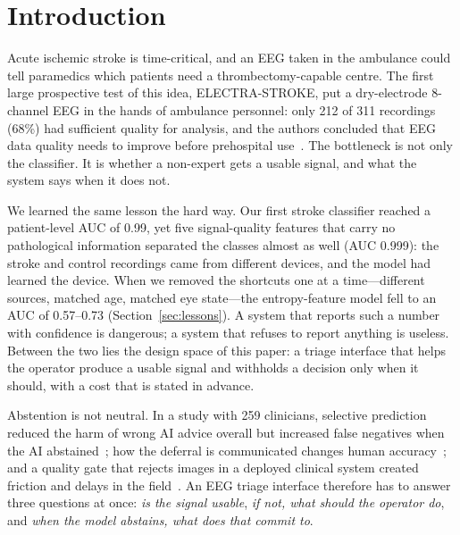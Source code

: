 \documentclass[sigconf,review,anonymous]{acmart}
\begin{document}
\maketitle

\section{Introduction}

Acute ischemic stroke is time-critical, and an EEG taken in the ambulance could tell paramedics which patients need a thrombectomy-capable centre.
The first large prospective test of this idea, ELECTRA-STROKE, put a dry-electrode 8-channel EEG in the hands of ambulance personnel: only 212 of 311 recordings (68\%) had sufficient quality for analysis, and the authors concluded that EEG data quality needs to improve before prehospital use~\cite{vanstigt2023electra}.
The bottleneck is not only the classifier. It is whether a non-expert gets a usable signal, and what the system says when it does not.

We learned the same lesson the hard way. Our first stroke classifier reached a patient-level AUC of 0.99, yet five signal-quality features that carry no pathological information separated the classes almost as well (AUC 0.999): the stroke and control recordings came from different devices, and the model had learned the device.
When we removed the shortcuts one at a time---different sources, matched age, matched eye state---the entropy-feature model fell to an AUC of 0.57--0.73 (Section~\ref{sec:lessons}).
A system that reports such a number with confidence is dangerous; a system that refuses to report anything is useless.
Between the two lies the design space of this paper: a triage interface that helps the operator produce a usable signal and withholds a decision only when it should, with a cost that is stated in advance.

Abstention is not neutral. In a study with 259 clinicians, selective prediction reduced the harm of wrong AI advice overall but increased false negatives when the AI abstained~\cite{jabbour2025}; how the deferral is communicated changes human accuracy~\cite{bondi2022}; and a quality gate that rejects images in a deployed clinical system created friction and delays in the field~\cite{beede2020}.
An EEG triage interface therefore has to answer three questions at once: \emph{is the signal usable}, \emph{if not, what should the operator do}, and \emph{when the model abstains, what does that commit to}.
\end{document}
